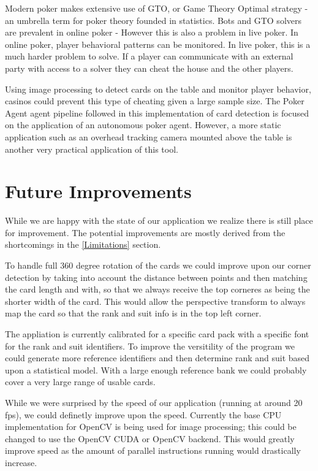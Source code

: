 \documentclass[conference]{IEEEtran}
\begin{document}
Modern poker makes extensive use of GTO, or Game Theory Optimal strategy - an umbrella term for
poker theory founded in statistics. Bots and GTO solvers are prevalent in online poker - However
this is also a problem in live poker. In online poker, player behavioral patterns can be monitored.
In live poker, this is a much harder problem to solve. If a player can communicate with an external
party with access to a solver they can cheat the house and the other players.

Using image processing to detect cards on the table and monitor player behavior, casinos could
prevent this type of cheating given a large sample size. The Poker Agent agent pipeline followed in
this implementation of card detection is focused on the application of an autonomous poker agent.
However, a more static application such as an overhead tracking camera mounted above the table is
another very practical application of this tool.


\section{Future Improvements}
While we are happy with the state of our application we realize there is still place for
improvement. The potential improvements are mostly derived from the shortcomings in the
\ref{Limitations} section.

To handle full 360 degree rotation of the cards we could improve upon our corner detection by taking
into account the distance between points and then matching the card length and with, so that we
always receive the top corneres as being the shorter width of the card. This would allow the
perspective transform to always map the card so that the rank and suit info is in the top left
corner.

The appliation is currently calibrated for a specific card pack with a specific font for the rank
and suit identifiers. To improve the versitility of the program we could generate more reference
identifiers and then determine rank and suit based upon a statistical model. With a large enough
reference bank we could probably cover a very large range of usable cards.

While we were surprised by the speed of our application (running at around 20 fps), we could
definetly improve upon the speed. Currently the base CPU implementation for OpenCV is being used for
image processing; this could be changed to use the OpenCV CUDA or OpenCV backend. This would greatly
improve speed as the amount of parallel instructions running would drastically increase.
\end{document}
